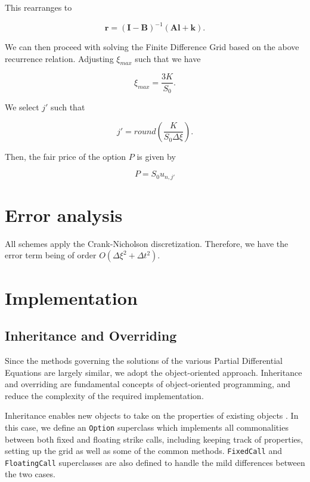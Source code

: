 \documentclass{article}
\begin{document}
This rearranges to

\begin{equation}
  \textbf{r} = (\textbf{I} - \textbf{B})^{-1}(\textbf{Al}+\textbf{k}).
\end{equation}

We can then proceed with solving the Finite Difference Grid based on the above recurrence relation. Adjusting \(\xi_{max}\) such that we have

\begin{equation}
  \xi_{max} = \frac{3K}{S_0}.
\end{equation}

We select \(j'\) such that

\begin{equation}
  j' = round(\frac{K}{S_0\Delta\xi}).
\end{equation}

Then, the fair price of the option \(P\) is given by

\begin{equation}
  P = S_0 u_{n, j'}
\end{equation}

\section{Error analysis}
All schemes apply the Crank-Nicholson discretization. Therefore, we have the error term being of order \(O(\Delta\xi^2 + \Delta t^2)\).

\section{Implementation}

\subsection{Inheritance and Overriding}
Since the methods governing the solutions of the various Partial Differential Equations are largely similar, we adopt the object-oriented approach. Inheritance and overriding are fundamental concepts of object-oriented programming, and reduce the complexity of the required implementation.

Inheritance enables new objects to take on the properties of existing objects \cite{oop_inheritance}. In this case, we define an \texttt{Option} superclass which implements all commonalities between both fixed and floating strike calls, including keeping track of properties, setting up the grid as well as some of the common methods. \texttt{FixedCall} and \texttt{FloatingCall} superclasses are also defined to handle the mild differences between the two cases.
\end{document}
